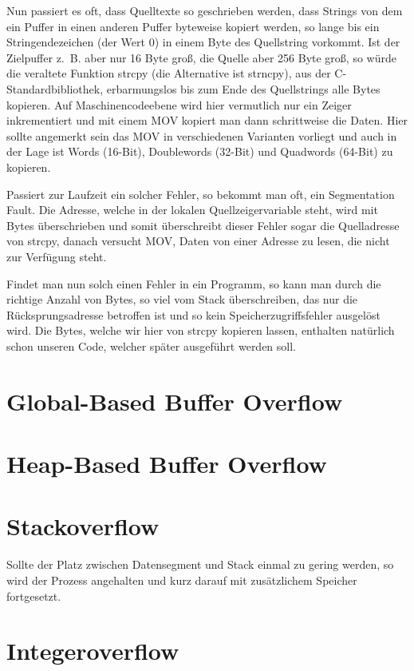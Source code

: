 \documentclass[12pt]{book}
\begin{document}
Nun passiert es oft, dass Quelltexte so geschrieben werden, dass Strings von dem
ein Puffer in einen anderen Puffer byteweise kopiert werden, so lange bis ein
Stringendezeichen (der Wert 0) in einem Byte des Quellstring vorkommt.  Ist der
Zielpuffer z. B. aber nur 16 Byte groß, die Quelle aber 256 Byte groß, so würde
die veraltete Funktion strcpy (die Alternative ist strncpy), aus der
C-Standardbibliothek, erbarmungslos bis zum Ende des Quellstrings alle Bytes
kopieren. Auf Maschinencodeebene wird hier vermutlich nur ein Zeiger
inkrementiert und mit einem MOV kopiert man dann schrittweise die Daten. Hier
sollte angemerkt sein das MOV in verschiedenen Varianten vorliegt und auch in
der Lage ist Words (16-Bit), Doublewords (32-Bit) und Quadwords (64-Bit) zu
kopieren.

Passiert zur Laufzeit ein solcher Fehler, so bekommt man oft, ein Segmentation
Fault. Die Adresse, welche in der lokalen Quellzeigervariable steht, wird mit
Bytes überschrieben und somit überschreibt dieser Fehler sogar die Quelladresse
von strcpy, danach versucht MOV, Daten von einer Adresse zu lesen, die nicht
zur Verfügung steht. 

Findet man nun solch einen Fehler in ein Programm, so kann man durch die
richtige Anzahl von Bytes, so viel vom Stack überschreiben, das nur die
Rücksprungsadresse betroffen ist und so kein Speicherzugriffsfehler ausgelöst
wird. Die Bytes, welche wir hier von strcpy kopieren lassen, enthalten natürlich
schon unseren Code, welcher später ausgeführt werden soll.

\section{Global-Based Buffer Overflow}

\section{Heap-Based Buffer Overflow}

\section{Stackoverflow}
Sollte der Platz zwischen Datensegment und Stack einmal zu gering werden, so
wird der Prozess angehalten und kurz darauf mit zusätzlichem Speicher
fortgesetzt.

\section{Integeroverflow}
\end{document}
